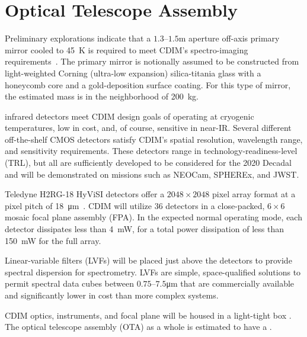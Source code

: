 \documentclass{ws-jai}
\begin{document}
\section{Optical Telescope Assembly}
\label{sec:ota}
Preliminary explorations indicate that a $1.3$--$1.5$\si{\meter} aperture off-axis primary mirror cooled to \SI{45}{\kelvin} is required to meet CDIM's spectro-imaging  requirements~\cite{cooray2016cdim2page}.
The primary mirror is notionally assumed to be constructed from light-weighted Corning (ultra-low expansion) silica-titania glass with a honeycomb core and a gold-deposition surface coating.
For this type of mirror, the estimated mass is in the neighborhood of \SI{200}{\kilo\gram}.

 infrared detectors meet CDIM design goals of operating at cryogenic temperatures, low in cost, and, of course, sensitive in near-IR.\@
Several different off-the-shelf CMOS detectors satisfy CDIM's spatial resolution, wavelength range, and sensitivity requirements.
These detectors range in technology-readiness-level (TRL), but all are sufficiently developed to be considered for the 2020 Decadal and will be demonstrated on missions such as NEOCam, SPHEREx, and JWST\@. 

Teledyne H2RG-18 HyViSI detectors offer a $2048\times2048$ pixel array format at a pixel pitch of \SI{18}{\micro\meter}~\cite{teledyneH2RG}.
CDIM will utilize 36 detectors in a close-packed, $6\times6$ mosaic focal plane assembly (FPA).
In the expected normal operating mode, each detector dissipates less than \SI{4}{\milli\watt}, for a total power dissipation of less than \SI{150}{\milli\watt} for the full array.

Linear-variable filters (LVFs) will be placed just above the detectors to provide spectral dispersion for spectrometry.
LVFs are simple, space-qualified solutions to permit spectral data cubes between $0.75$--$7.5$\si{\micro\meter} that are commercially available and significantly lower in cost than more complex systems. 

CDIM optics, instruments, and focal plane will be housed in a light-tight box .
The optical telescope assembly (OTA) as a whole is estimated to have a .
\end{document}

